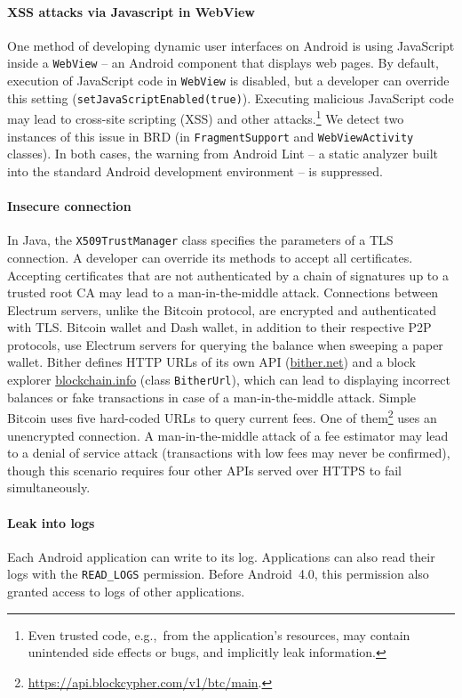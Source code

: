 \paragraph{XSS attacks via Javascript in WebView}
One method of developing dynamic user interfaces on Android is using JavaScript inside a \texttt{WebView} -- an Android component that displays web pages.
By default, execution of JavaScript code in \texttt{WebView} is disabled, but a developer can override this setting (\texttt{setJavaScriptEnabled(true)}).
Executing malicious JavaScript code may lead to cross-site scripting (XSS) and other attacks.\footnote{Even trusted code, e.g.,~from the application's resources, may contain unintended side effects or bugs, and implicitly leak information.}
We detect two instances of this issue in BRD (in \texttt{FragmentSupport} and \texttt{WebViewActivity} classes).
In both cases, the warning from Android Lint -- a static analyzer built into the standard Android development environment -- is suppressed.

\paragraph{Insecure connection}
In Java, the \texttt{X509TrustManager} class specifies the parameters of a TLS connection.
A developer can override its methods to accept all certificates.
Accepting certificates that are not authenticated by a chain of signatures up to a trusted root CA may lead to a man-in-the-middle attack.
Connections between Electrum servers, unlike the Bitcoin protocol, are encrypted and authenticated with TLS\@.
Bitcoin wallet and Dash wallet, in addition to their respective P2P protocols, use Electrum servers for querying the balance when sweeping a paper wallet.
Bither defines HTTP URLs of its own API (\url{bither.net}) and a block explorer \url{blockchain.info} (class \texttt{BitherUrl}), which can lead to displaying incorrect balances or fake transactions in case of a man-in-the-middle attack.
Simple Bitcoin uses five hard-coded URLs to query current fees.
One of them\footnote{\url{https://api.blockcypher.com/v1/btc/main}.} uses an unencrypted connection.
A man-in-the-middle attack of a fee estimator may lead to a denial of service attack (transactions with low fees may never be confirmed), though this scenario requires four other APIs served over HTTPS to fail simultaneously.

\paragraph{Leak into logs}
Each Android application can write to its log.
Applications can also read their logs with the \texttt{READ\_LOGS} permission.
Before Android~4.0, this permission also granted access to logs of other applications.

